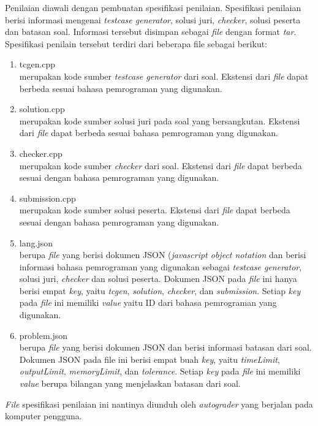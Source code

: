 \par Penilaian diawali dengan pembuatan spesifikasi penilaian. Spesifikasi penilaian berisi informasi mengenai \textit{testcase generator}, solusi juri, \textit{checker}, solusi peserta dan batasan soal. Informasi tersebut disimpan sebagai \textit{file} dengan format \textit{tar}. Spesifikasi penilain tersebut terdiri dari beberapa file sebagai berikut:
\begin{enumerate}
    \item tcgen.cpp\\ merupakan kode sumber \textit{testcase generator} dari soal. Ekstensi dari \textit{file} dapat berbeda sesuai bahasa pemrograman yang digunakan.
    \item solution.cpp\\ merupakan kode sumber  solusi juri pada soal yang bersangkutan. Ekstensi dari \textit{file} dapat berbeda sesuai bahasa pemrograman yang digunakan.
    \item checker.cpp\\ merupakan kode sumber \textit{checker} dari soal. Ekstensi dari \textit{file} dapat berbeda sesuai dengan bahasa pemrograman yang digunakan.
    \item submission.cpp\\ merupakan kode sumber solusi peserta. Ekstensi dari \textit{file} dapat berbeda sesuai dengan bahasa pemrograman yang digunakan.
    \item lang.json\\ berupa \textit{file} yang berisi dokumen JSON (\textit{javascript object notation} dan berisi informasi bahasa pemrograman yang digunakan sebagai \textit{testcase generator}, solusi juri, \textit{checker} dan solusi peserta. Dokumen JSON pada \textit{file} ini hanya berisi empat \textit{key}, yaitu \textit{tcgen}, \textit{solution}, \textit{checker}, dan \textit{submission}. Setiap \textit{key} pada \textit{file} ini memiliki \textit{value} yaitu ID dari bahasa pemrograman yang digunakan.
    \item problem.json\\ berupa \textit{file} yang berisi dokumen JSON dan berisi informasi batasan dari soal. Dokumen JSON pada file ini berisi empat buah \textit{key}, yaitu \textit{timeLimit}, \textit{outputLimit}, \textit{memoryLimit}, dan \textit{tolerance}. Setiap \textit{key} pada \textit{file} ini memiliki \textit{value}  berupa bilangan yang menjelaskan batasan dari soal.
\end{enumerate}
\par \textit{File} spesifikasi penilaian ini nantinya diunduh oleh \textit{autograder} yang berjalan pada komputer pengguna.

